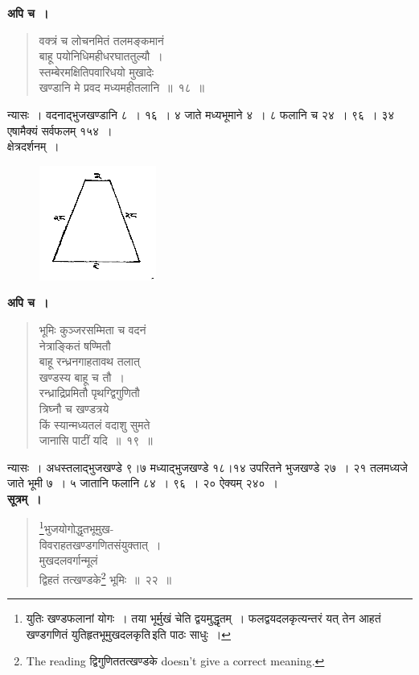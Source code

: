 \documentclass[11pt, openany]{book}
\begin{document}
 \textbf{अपि च~।} 
\begin{quote}
    \bqt 
     वक्त्रं च लोचनमितं तलमङ्कमानं \\
     बाहू पयोनिधिमहीधरघाततुल्यौ~।\\
स्तम्बेरमक्षितिपवारिधयो मुखादेः \\
खण्डानि मे प्रवद मध्यमहीतलानि~॥~१८~॥
\end{quote}

 न्यासः~। वदनाद्भुजखण्डानि ८~। १६~। ४ जाते मध्यभूमाने
४~। ८ फलानि च २४~। ९६~। ३४ एषामैक्यं सर्वफलम् १५४~। \\

\vspace{-2mm}
 क्षेत्रदर्शनम्~। 
\vspace{-2mm}

\begin{figure}[h!]
    \centering
    \includegraphics[scale=0.7]{graphics/capture25.png}
\end{figure}

\newpage
 \textbf{अपि च~।} 
\begin{quote}
    \bqt 
     भूमिः कुञ्जरसम्मिता च वदनं \\
     नेत्राङ्कितं षण्मितौ \\
     बाहू रन्ध्रनगाहतावथ तलात् \\
     खण्डस्य बाहू च तौ~।\\
रन्ध्राद्रिप्रमितौ पृथग्द्विगुणितौ \\
त्रिघ्नौ च खण्डत्रये \\
किं स्यान्मध्यतलं वदाशु सुमते \\
जानासि पाटीं यदि~॥~१९~॥
\end{quote}

 न्यासः~। अधस्तलाद्भुजखण्डे ९\;।\;७ मध्याद्भुजखण्डे १८\;।\;१४
उपरितने भुजखण्डे २७~। २१ तलमध्यजे जाते भूमी ७~। ५ जातानि 
फलानि ८४~। ९६~। २० ऐक्यम् २४०~। \\

\setcounter{footnote}{0}
 \textbf{सूत्रम्~।} 
\begin{quote}
    \bs 
    \footnote{युतिः खण्डफलानां योगः~। तया भूर्मुखं चेति
द्वयमुद्धृतम्~। फलद्वयदलकृत्यन्तरं यत् तेन आहतं खण्डगणितं युतिहृतभूमुखदलकृति\textendash \,इति पाठः साधुः~। }भुजयोगोद्धृतभूमुख-\\
विवराहतखण्डगणितसंयुक्तात्~।\\
मुखदलवर्गान्मूलं \\
द्विहतं तत्खण्डके\footnote{The reading द्विगुणिततत्खण्डके doesn't give a correct meaning.} भूमिः~॥~२२~॥
\end{quote}
 
\end{document}
